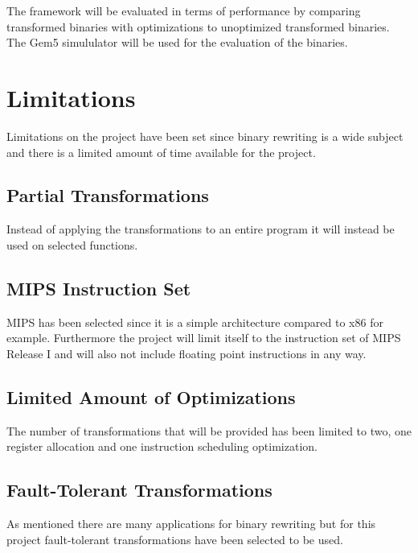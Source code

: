 The framework will be evaluated in terms of performance by
comparing transformed binaries with optimizations to
unoptimized transformed binaries. The Gem5 simululator will
be used for the evaluation of the binaries.

\section{Limitations}
Limitations on the project have been set since binary rewriting 
is a wide subject and there is a limited amount of time available
for the project.

\subsection{Partial Transformations}
Instead of applying the transformations to an entire program
it will instead be used on selected functions.

\subsection{MIPS Instruction Set}
MIPS has been selected since it is a simple architecture compared
to x86 for example. Furthermore the project will limit itself
to the instruction set of MIPS Release I and will also not
include floating point instructions in any way.  

\subsection{Limited Amount of Optimizations}
The number of transformations that will be provided has been
limited to two, one register allocation and one instruction
scheduling optimization.

\subsection{Fault-Tolerant Transformations}
As mentioned there are many applications for binary rewriting
but for this project fault-tolerant transformations have
been selected to be used. 



